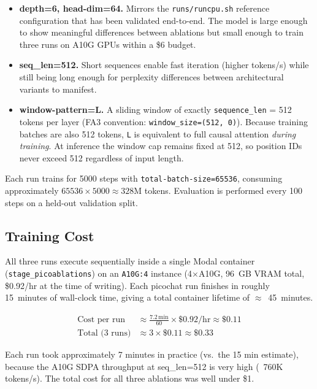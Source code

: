 \documentclass[a4paper,12pt]{article}
\begin{document}
\begin{itemize}
  \item \textbf{depth=6, head-dim=64.}  Mirrors the \texttt{runs/runcpu.sh}
        reference configuration that has been validated end-to-end.  The
        model is large enough to show meaningful differences between
        ablations but small enough to train three runs on A10G GPUs within
        a \$6 budget.
  \item \textbf{seq\_len=512.}  Short sequences enable fast iteration
        (higher tokens/s) while still being long enough for perplexity
        differences between architectural variants to manifest.
  \item \textbf{window-pattern=L.}  A sliding window of exactly
        \texttt{sequence\_len} = 512 tokens per layer (FA3 convention:
        \texttt{window\_size=(512,~0)}).  Because training batches are also
        512 tokens, \texttt{L} is equivalent to full causal attention
        \emph{during training}.  At inference the window cap remains fixed
        at 512, so position IDs never exceed 512 regardless of input length.
\end{itemize}

\noindent Each run trains for 5000 steps with \texttt{total-batch-size=65536},
consuming approximately $65536 \times 5000 \approx 328\text{M}$ tokens.
Evaluation is performed every 100 steps on a held-out validation split.

\subsection{Training Cost}

\noindent All three runs execute sequentially inside a single Modal container
(\texttt{stage\_picoablations}) on an \texttt{A10G:4} instance
(4$\times$A10G, 96~GB VRAM total, \$0.92/hr at the time of writing).
Each picochat run finishes in roughly 15~minutes of wall-clock time,
giving a total container lifetime of $\approx$~45~minutes.

\begin{align*}
  \text{Cost per run} &\approx \frac{7.2\,\text{min}}{60} \times \$0.92/\text{hr}
                         \approx \$0.11 \\
  \text{Total (3 runs)} &\approx 3 \times \$0.11 \approx \$0.33
\end{align*}

\noindent Each run took approximately 7 minutes in practice (vs.\ the 15 min estimate),
because the A10G SDPA throughput at seq\_len=512 is very high (~760K tokens/s).
The total cost for all three ablations was well under \$1.
\end{document}
